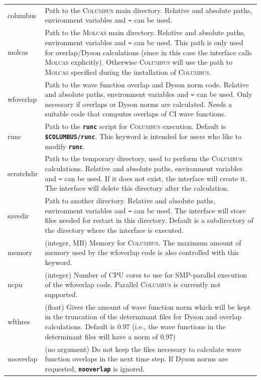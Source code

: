 \documentclass[a4paper,10pt,DIV=15,openany]{scrbook}
\newcommand{\ttt}[1]{\textbf{\texttt{#1}}}
\begin{document}
\begin{longtable}{>{\ttfamily}lp{12cm}}
columbus        &Path to the \textsc{Columbus} main directory. Relative and absolute paths, environment variables and \ttt{\textasciitilde} can be used.\\
molcas          &Path to the \textsc{Molcas} main directory.  Relative and absolute paths, environment variables and \ttt{\textasciitilde} can be used. This path is only used for overlap/Dyson calculations (since in this case the interface calls \textsc{Molcas} explicitly). Otherwise \textsc{Columbus} will use the path to \textsc{Molcas} specified during the installation of \textsc{Columbus}.\\
wfoverlap       &Path to the wave function overlap and Dyson norm code. Relative and absolute paths, environment variables and \ttt{\textasciitilde} can be used. Only necessary if overlaps or Dyson norms are calculated. Needs a suitable code that computes overlaps of CI wave functions.\\
runc            &Path to the \ttt{runc} script for \textsc{Columbus} execution. Default is \ttt{\$COLUMBUS/runc}. This keyword is intended for users who like to modify \ttt{runc}.\\
scratchdir      &Path to the temporary directory, used to perform the \textsc{Columbus} calculations. Relative and absolute paths, environment variables and \ttt{\textasciitilde} can be used. If it does not exist, the interface will create it. The interface will delete this directory after the calculation.\\
savedir         &Path to another directory.  Relative and absolute paths, environment variables and \ttt{\textasciitilde} can be used. The interface will store files needed for restart in this directory. Default is a subdirectory of the directory where the interface is executed.\\
memory          &(integer, MB) Memory for \textsc{Columbus}. The maximum amount of memory used by the wfoverlap code is also controlled with this keyword.\\
ncpu            &(integer) Number of CPU cores to use for SMP-parallel execution of the wfoverlap code. Parallel \textsc{Columbus} is currently not supported.\\
wfthres         &(float) Gives the amount of wave function norm which will be kept in the truncation of the determinant files for Dyson and overlap calculations. Default is 0.97 (i.e., the wave functions in the determinant files will have a norm of 0.97)\\
nooverlap       &(no argument) Do not keep the files necessary to calculate wave function overlaps in the next time step. If Dyson norms are requested, \ttt{nooverlap} is ignored.\\

\end{longtable}
\end{document}
